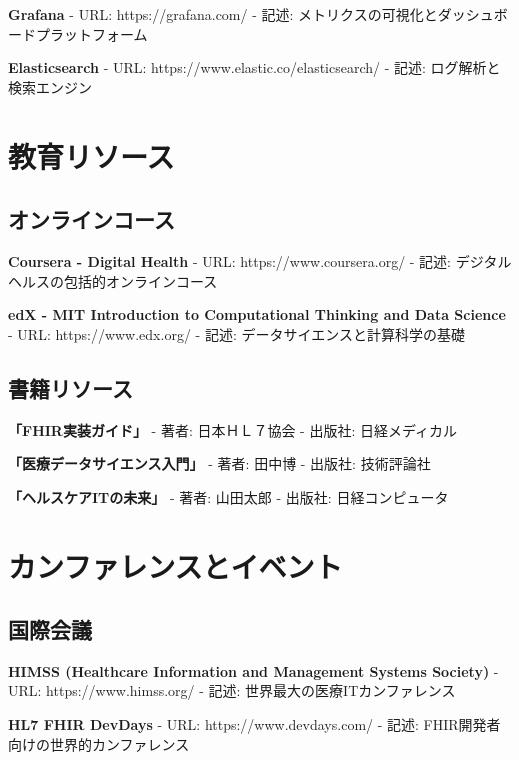 \documentclass[
  a4paper,
  a4paper,
  11pt]{ltjsbook}
\begin{document}
\textbf{Grafana} - URL: https://grafana.com/ - 記述:
メトリクスの可視化とダッシュボードプラットフォーム

\textbf{Elasticsearch} - URL: https://www.elastic.co/elasticsearch/ -
記述: ログ解析と検索エンジン

\section{教育リソース}\label{ux6559ux80b2ux30eaux30bdux30fcux30b9}

\subsection{オンラインコース}\label{ux30aaux30f3ux30e9ux30a4ux30f3ux30b3ux30fcux30b9}

\textbf{Coursera - Digital Health} - URL: https://www.coursera.org/ -
記述: デジタルヘルスの包括的オンラインコース

\textbf{edX - MIT Introduction to Computational Thinking and Data
Science} - URL: https://www.edx.org/ - 記述:
データサイエンスと計算科学の基礎

\subsection{書籍リソース}\label{ux66f8ux7c4dux30eaux30bdux30fcux30b9}

\textbf{「FHIR実装ガイド」} - 著者: 日本ＨＬ７協会 - 出版社:
日経メディカル

\textbf{「医療データサイエンス入門」} - 著者: 田中博 - 出版社:
技術評論社

\textbf{「ヘルスケアITの未来」} - 著者: 山田太郎 - 出版社:
日経コンピュータ

\section{カンファレンスとイベント}\label{ux30abux30f3ux30d5ux30a1ux30ecux30f3ux30b9ux3068ux30a4ux30d9ux30f3ux30c8}

\subsection{国際会議}\label{ux56fdux969bux4f1aux8b70}

\textbf{HIMSS (Healthcare Information and Management Systems Society)} -
URL: https://www.himss.org/ - 記述: 世界最大の医療ITカンファレンス

\textbf{HL7 FHIR DevDays} - URL: https://www.devdays.com/ - 記述:
FHIR開発者向けの世界的カンファレンス
\end{document}
